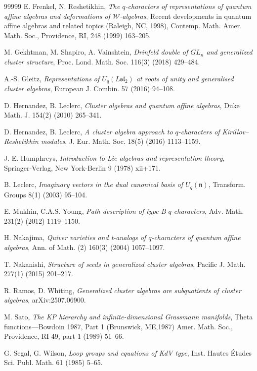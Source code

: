 \documentclass[11pt, reqno]{amsart}
\theoremstyle{plain}
\theoremstyle{definition}
\numberwithin{equation}{section}
\begin{document}
\begin{thebibliography}{99999}
 E. Frenkel, N. Reshetikhin, \textit{The {$q$}-characters of representations of quantum affine algebras and deformations of {$\mathscr W$}-algebras}, Recent developments in quantum affine algebras and related topics  ({R}aleigh, {NC}, 1998), Contemp. Math. Amer. Math. Soc., Providence, RI, 248 (1999) 163--205.

 M. Gekhtman, M. Shapiro, A. Vainshtein, \textit{Drinfeld double of {$GL_n$} and generalized cluster structure}, Proc. Lond. Math. Soc. 116(3) (2018) 429--484.

 A.-S. Gleitz, \textit{Representations of {$U_q(L\mathfrak{sl}_2)$} at roots of unity and generalised cluster algebras}, European J. Combin. 57 (2016) 94--108.

 D. Hernandez, B. Leclerc, \textit{Cluster algebras and quantum affine algebras}, Duke Math. J. 154(2) (2010) 265--341.

 D. Hernandez, B. Leclerc, \textit{A cluster algebra approach to {$q$}-characters of {K}irillov–{R}eshetikhin modules}, J. Eur. Math. Soc. 18(5) (2016) 1113--1159. 

 J. E. Humphreys, \textit{Introduction to {L}ie algebras and representation theory}, Springer-Verlag, New York-Berlin 9 (1978) xii+171.

 B. Leclerc, \textit{Imaginary vectors in the dual canonical basis of {$U_q(\mathfrak{n})$}}, Transform. Groups 8(1) (2003) 95--104.

 E. Mukhin, C.A.S. Young, \textit{Path description of type B {$q$}-characters}, Adv. Math. 231(2) (2012) 1119--1150.

 H. Nakajima, \textit{Quiver varieties and t-analogs of $q$-characters of quantum affine algebras}, Ann. of Math. (2) 160(3) (2004) 1057--1097.

 T. Nakanishi, \textit{Structure of seeds in generalized cluster algebras}, Pacific J. Math. 277(1) (2015) 201--217.

 R. Ramos, D. Whiting, \textit{Generalized cluster algebras are subquotients of cluster algebras}, arXiv:2507.06900. 

 M. Sato, \textit{The {KP} hierarchy and infinite-dimensional Grassmann manifolds}, Theta functions---{B}owdoin 1987, {P}art 1 ({B}runswick, {ME},1987) Amer. Math. Soc., Providence, RI 49, part 1 (1989) 51--66. 

 G. Segal, G. Wilson, \textit{Loop groups and equations of {K}d{V} type}, Inst. Hautes \'Etudes Sci. Publ. Math. 61 (1985) 5--65.

\end{thebibliography}
\end{document}
